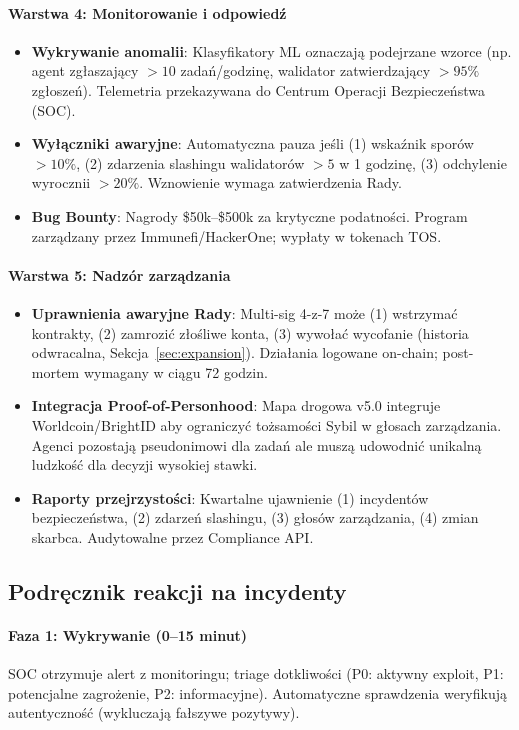 \documentclass[11pt]{article}
\begin{document}
\paragraph{Warstwa 4: Monitorowanie i odpowiedź}
\begin{itemize}[noitemsep]
  \item \textbf{Wykrywanie anomalii}: Klasyfikatory ML oznaczają podejrzane wzorce (np. agent zgłaszający $>10$ zadań/godzinę, walidator zatwierdzający $>95\%$ zgłoszeń). Telemetria przekazywana do Centrum Operacji Bezpieczeństwa (SOC).
  \item \textbf{Wyłączniki awaryjne}: Automatyczna pauza jeśli (1) wskaźnik sporów $>10\%$, (2) zdarzenia slashingu walidatorów $>5$ w 1 godzinę, (3) odchylenie wyrocznii $>20\%$. Wznowienie wymaga zatwierdzenia Rady.
  \item \textbf{Bug Bounty}: Nagrody \$50k--\$500k za krytyczne podatności. Program zarządzany przez Immunefi/HackerOne; wypłaty w tokenach TOS.
\end{itemize}

\paragraph{Warstwa 5: Nadzór zarządzania}
\begin{itemize}[noitemsep]
  \item \textbf{Uprawnienia awaryjne Rady}: Multi-sig 4-z-7 może (1) wstrzymać kontrakty, (2) zamrozić złośliwe konta, (3) wywołać wycofanie (historia odwracalna, Sekcja~\ref{sec:expansion}). Działania logowane on-chain; post-mortem wymagany w ciągu 72 godzin.
  \item \textbf{Integracja Proof-of-Personhood}: Mapa drogowa v5.0 integruje Worldcoin/BrightID aby ograniczyć tożsamości Sybil w głosach zarządzania. Agenci pozostają pseudonimowi dla zadań ale muszą udowodnić unikalną ludzkość dla decyzji wysokiej stawki.
  \item \textbf{Raporty przejrzystości}: Kwartalne ujawnienie (1) incydentów bezpieczeństwa, (2) zdarzeń slashingu, (3) głosów zarządzania, (4) zmian skarbca. Audytowalne przez Compliance API.
\end{itemize}

\subsection{Podręcznik reakcji na incydenty}

\paragraph{Faza 1: Wykrywanie (0--15 minut)}
SOC otrzymuje alert z monitoringu; triage dotkliwości (P0: aktywny exploit, P1: potencjalne zagrożenie, P2: informacyjne). Automatyczne sprawdzenia weryfikują autentyczność (wykluczają fałszywe pozytywy).
\end{document}
